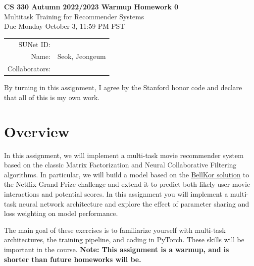 \documentclass[12pt]{article}
\begin{document}
    \begin{center}
    {\Large \textbf{CS 330 Autumn 2022/2023 Warmup Homework 0} \\ Multitask Training for Recommender Systems
    \\ Due Monday October 3, 11:59 PM PST}
        \vspace{0.2cm}

        \begin{tabular}{rl}
            SUNet ID:      &                \\
            Name:          & Seok, Jeongeum \\
            Collaborators: &
        \end{tabular}
    \end{center}

    By turning in this assignment, I agree by the Stanford honor code and declare
    that all of this is my own work.


    \section{Overview}
    In this assignment, we will implement a multi-task movie recommender system based on the classic Matrix Factorization \cite{Yehuda2009matrix} and Neural Collaborative Filtering ~\cite{he2017neural} algorithms. In particular, we will build a model based on the \href{https://www2.seas.gwu.edu/~simhaweb/champalg/cf/papers/KorenBellKor2009.pdf}{BellKor solution} to the Netflix Grand Prize challenge and extend it to predict both likely user-movie interactions and potential scores. In this assignment you will implement a multi-task neural network architecture and explore the effect of parameter sharing and loss weighting on model performance.

    \vspace{0.2cm}
    \noindent The main goal of these exercises is to familiarize yourself with multi-task architectures, the training pipeline, and coding in PyTorch. These skills will be important in the course. \textbf{Note: This assignment is a warmup, and is shorter than future homeworks will be.}

    \vspace{0.2cm}
\end{document}
